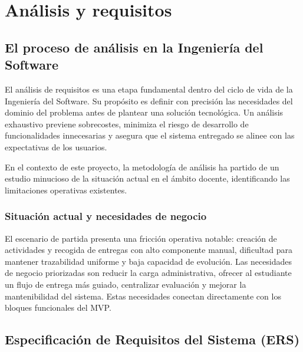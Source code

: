 \chapter{An\'alisis y requisitos}\label{cap_requisitos}
\makeatletter
{}
\makeatother

\FloatBarrier

\section{El proceso de an\'alisis en la Ingenier\'ia del Software}

El an\'alisis de requisitos es una etapa fundamental dentro del ciclo de vida de la Ingenier\'ia del Software. Su prop\'osito es definir con precisi\'on las necesidades del dominio del problema antes de plantear una soluci\'on tecnol\'ogica. Un an\'alisis exhaustivo previene sobrecostes, minimiza el riesgo de desarrollo de funcionalidades innecesarias y asegura que el sistema entregado se alinee con las expectativas de los usuarios.

En el contexto de este proyecto, la metodolog\'ia de an\'alisis ha partido de un estudio minucioso de la situaci\'on actual en el \'ambito docente, identificando las limitaciones operativas existentes. 

\subsection{Situaci\'on actual y necesidades de negocio}
El escenario de partida presenta una fricci\'on operativa notable: creaci\'on de actividades y recogida de entregas con alto componente manual, dificultad para mantener trazabilidad uniforme y baja capacidad de evoluci\'on. Las necesidades de negocio priorizadas son reducir la carga administrativa, ofrecer al estudiante un flujo de entrega m\'as guiado, centralizar evaluaci\'on y mejorar la mantenibilidad del sistema. Estas necesidades conectan directamente con los bloques funcionales del MVP.

\FloatBarrier
\section{Especificaci\'on de Requisitos del Sistema (ERS)}

